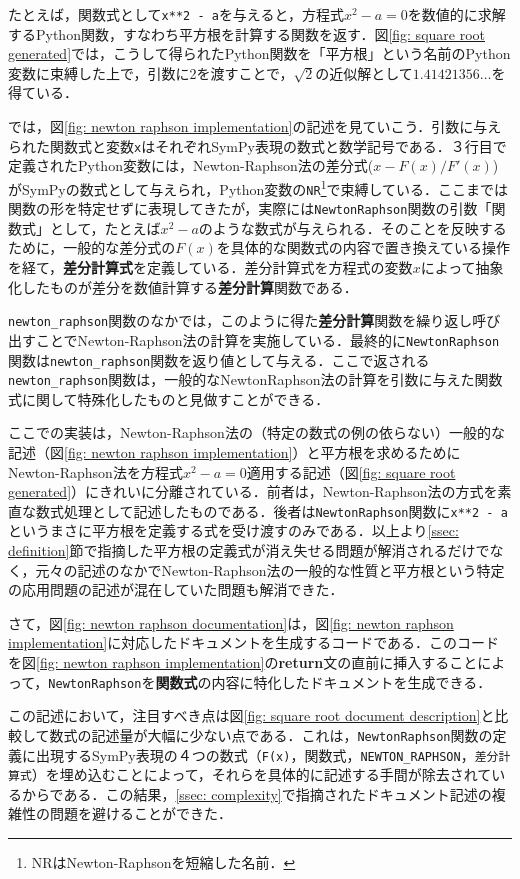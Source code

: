 たとえば，関数式として\verb|x**2 - a|を与えると，方程式$x^2 - a = 0$を数値的に求解するPython関数，すなわち平方根を計算する関数を返す．図\ref {fig: square root generated}では，こうして得られたPython関数を「平方根」という名前のPython変数に束縛した上で，引数に2を渡すことで，$\sqrt {2}$の近似解として$1.41421356\ldots$を得ている．

では，図\ref {fig: newton raphson implementation}の記述を見ていこう．引数に与えられた関数式と変数\verb|x|はそれぞれSymPy表現の数式と数学記号である．３行目で定義されたPython変数には，Newton-Raphson法の差分式($x - F(x) / F'(x)$)がSymPyの数式として与えられ，Python変数の\verb|NR|\footnote {NRはNewton-Raphsonを短縮した名前．}で束縛している．ここまでは関数の形を特定せずに表現してきたが，実際には\verb|NewtonRaphson|関数の引数「関数式」として，たとえば$x^2 - a$のような数式が与えられる．そのことを反映するために，一般的な差分式の$F(x)$を具体的な関数式の内容で置き換えている操作を経て，\textbf {差分計算式}を定義している．差分計算式を方程式の変数$x$によって抽象化したものが差分を数値計算する\textbf {差分計算}関数である．

\verb|newton_raphson|関数のなかでは，このように得た\textbf {差分計算}関数を繰り返し呼び出すことでNewton-Raphson法の計算を実施している．最終的に\verb|NewtonRaphson|関数は\verb|newton_raphson|関数を返り値として与える．ここで返される\verb|newton_raphson|関数は，一般的なNewtonRaphson法の計算を引数に与えた関数式に関して特殊化したものと見做すことができる．

ここでの実装は，Newton-Raphson法の（特定の数式の例の依らない）一般的な記述（図\ref {fig: newton raphson implementation}）と平方根を求めるためにNewton-Raphson法を方程式$x^2 -a = 0$適用する記述（図\ref {fig: square root generated}）にきれいに分離されている．前者は，Newton-Raphson法の方式を素直な数式処理として記述したものである．後者は\verb|NewtonRaphson|関数に\verb|x**2 - a|というまさに平方根を定義する式を受け渡すのみである．以上より\ref {ssec: definition}節で指摘した平方根の定義式が消え失せる問題が解消されるだけでなく，元々の記述のなかでNewton-Raphson法の一般的な性質と平方根という特定の応用問題の記述が混在していた問題も解消できた．

さて，図\ref {fig: newton raphson documentation}は，図\ref {fig: newton raphson implementation}に対応したドキュメントを生成するコードである．このコードを図\ref {fig: newton raphson implementation}の\textbf {return}文の直前に挿入することによって，\verb|NewtonRaphson|を\textbf {関数式}の内容に特化したドキュメントを生成できる．

この記述において，注目すべき点は図\ref {fig: square root document description}と比較して数式の記述量が大幅に少ない点である．これは，\verb|NewtonRaphson|関数の定義に出現するSymPy表現の４つの数式（\verb|F(x)|，関数式，\verb|NEWTON_RAPHSON|，\verb|差分計算式|）を埋め込むことによって，それらを具体的に記述する手間が除去されているからである．この結果，\ref {ssec: complexity}で指摘されたドキュメント記述の複雑性の問題を避けることができた．

